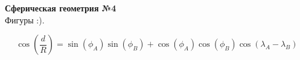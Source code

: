 


    \begin{center}
        \textbf{Сферическая геометрия №4}\\
        Фигуры :).
    \end{center}

    \[
        \cos\left(\frac{d}{R}\right) = \sin(\phi_A)\sin(\phi_B) + \cos(\phi_A)\cos(\phi_B)\cos(\lambda_A - \lambda_B)
    \]

